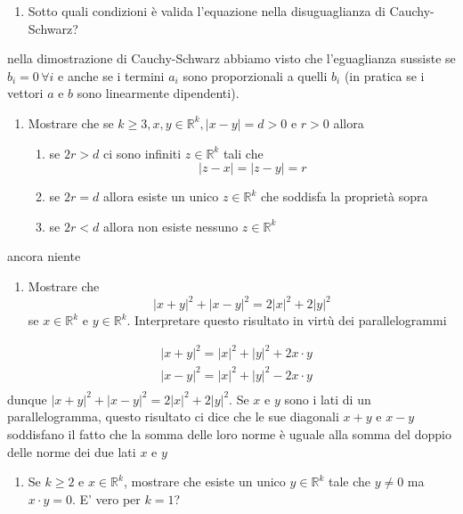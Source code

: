 \documentclass{report}
\begin{document}
\begin{enumerate}[resume, label=\protect\circled{\arabic*}]
	\item Sotto quali condizioni è valida l'equazione nella disuguaglianza di Cauchy-Schwarz?
\end{enumerate}
\begin{mysolution}
nella dimostrazione di Cauchy-Schwarz abbiamo visto che l'eguaglianza sussiste se $b_i = 0 \, \forall i$ e anche se i termini $a_i$ sono proporzionali a quelli $b_i$ (in pratica se i vettori \textbf{$a$} e \textbf{$b$} sono linearmente dipendenti).
\end{mysolution}
\begin{enumerate}[resume, label=\protect\circled{\arabic*}]
	\item Mostrare che se $k \geq 3, x, y \in \mathbb{R}^k, |x-y|=d>0$ e $r > 0$ allora
		\begin{enumerate}
			\item se $2r > d$ ci sono infiniti $z \in \mathbb{R}^k$ tali che
			$$
				|z-x| = |z-y| = r
			$$
			\item se $2r=d$ allora esiste un unico $z \in \mathbb{R}^k$ che soddisfa la proprietà sopra
			\item se $2r < d$ allora non esiste nessuno $z \in \mathbb{R}^k$
		\end{enumerate}
\end{enumerate}
\begin{mysolution}
ancora niente
\end{mysolution}
\begin{enumerate}[resume, label=\protect\circled{\arabic*}]
	\item Mostrare che
	$$
		|x+y|^2 + |x-y|^2 = 2|x|^2 + 2|y|^2
	$$
	se $x \in \mathbb{R}^k$ e $y \in \mathbb{R}^k$. Interpretare questo risultato in virtù dei parallelogrammi
\end{enumerate}
\begin{mysolution} \begin{align*}
	&|x+y|^2 = |x|^2 + |y|^2 + 2 x \cdot y \\
	&|x-y|^2 = |x|^2 + |y|^2 - 2 x \cdot y \\
	\end{align*}
	dunque $|x+y|^2 + |x-y|^2 = 2|x|^2 + 2|y|^2$. Se $x$ e $y$ sono i lati di un parallelogramma, questo risultato ci dice che le sue diagonali $x+y$ e $x-y$ soddisfano il fatto che la somma delle loro norme è uguale alla somma del doppio delle norme dei due lati $x$ e $y$
\end{mysolution}
\begin{enumerate}[resume, label=\protect\circled{\arabic*}]
	\item Se $k \geq 2$ e $x \in \mathbb{R}^k$, mostrare che esiste un unico $y \in \mathbb{R}^k$ tale che $y \neq 0$ ma $x \cdot y = 0$. E' vero per $k=1$?
\end{enumerate}
\end{document}
